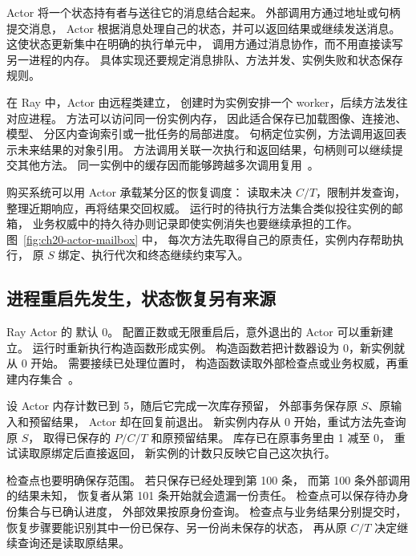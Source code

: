 Actor 将一个状态持有者与送往它的消息结合起来。
外部调用方通过地址或句柄提交消息，
Actor 根据消息处理自己的状态，并可以返回结果或继续发送消息。
这使状态更新集中在明确的执行单元中，
调用方通过消息协作，而不用直接读写另一进程的内存。
具体实现还要规定消息排队、方法并发、实例失败和状态保存规则。

在 Ray 中，Actor 由远程类建立，
创建时为实例安排一个 worker，后续方法发往对应进程。
方法可以访问同一份实例内存，
因此适合保存已加载图像、连接池、模型、
分区内查询索引或一批任务的局部进度。
句柄定位实例，方法调用返回表示未来结果的对象引用。
方法调用关联一次执行和返回结果，句柄则可以继续提交其他方法。
同一实例中的缓存因而能够跨越多次调用复用~\cite{ray259-actors}。

购买系统可以用 Actor 承载某分区的恢复调度：
读取未决 $C/T$，限制并发查询，整理近期响应，再将结果交回权威。
运行时的待执行方法集合类似投往实例的邮箱，
业务权威中的持久待办则记录即使实例消失也要继续承担的工作。
图~\ref{fig:ch20-actor-mailbox} 中，
每次方法先取得自己的原责任，实例内存帮助执行，
原 $S$ 绑定、执行代次和终态继续约束写入。


\subsection{进程重启先发生，状态恢复另有来源}

Ray Actor 的  默认 0。
配置正数或无限重启后，意外退出的 Actor 可以重新建立。
运行时重新执行构造函数形成实例。
构造函数若把计数器设为 0，新实例就从 0 开始。
需要接续已处理位置时，
构造函数读取外部检查点或业务权威，再重建内存集合~\cite{ray259-actor-fault}。

设 Actor 内存计数已到 5，随后它完成一次库存预留，
外部事务保存原 $S$、原输入和预留结果，
Actor 却在回复前退出。
新实例内存从 0 开始，重试方法先查询原 $S$，
取得已保存的 $P/C/T$ 和原预留结果。
库存已在原事务里由 1 减至 0，
重试读取原绑定后直接返回，
新实例的计数只反映它自己这次执行。


检查点也要明确保存范围。
若只保存已经处理到第 100 条，
而第 100 条外部调用的结果未知，
恢复者从第 101 条开始就会遗漏一份责任。
检查点可以保存待办身份集合与已确认进度，
外部效果按原身份查询。
检查点与业务结果分别提交时，
恢复步骤要能识别其中一份已保存、另一份尚未保存的状态，
再从原 $C/T$ 决定继续查询还是读取原结果。

